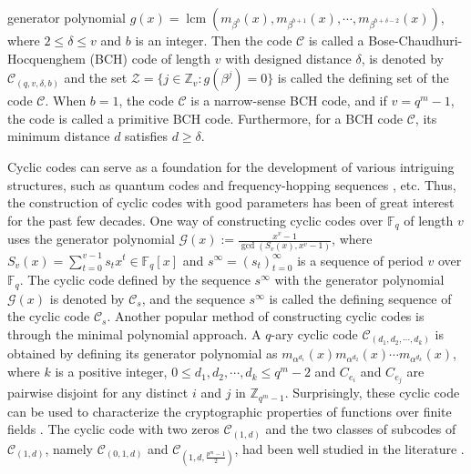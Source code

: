 \documentclass[pdflatex,sn-mathphys-num]{sn-jnl}%
\theoremstyle{thmstyleone}%
\theoremstyle{thmstyletwo}%
\theoremstyle{thmstylethree}%
\begin{document}
generator polynomial $g(x)=\operatorname{lcm}(m_{\beta^{b}}(x), m_{\beta^{b+1}}(x),\cdots,m_{\beta^{b+\delta-2}}(x))$, where $2\leq \delta\leq v$ and $b$ is an integer. Then the code $\mathcal{C}$ is called a Bose-Chaudhuri-Hocquenghem (BCH) code of length $v$ with designed distance $\delta$, is denoted by $\mathcal{C}_{(q,v,\delta,b)}$ and the set $\mathcal{Z}=\{j\in\mathbb{Z}_{v}:g(\beta^{j})=0\}$ is called the defining set of the code $\mathcal{C}$. When $b=1$, the code $\mathcal{C}$ is a narrow-sense BCH code, and if $v=q^m-1$, the code is called a primitive BCH code. Furthermore, for a BCH code $\mathcal{C}$, its minimum distance $d$ satisfies $d\geq\delta$.
\par Cyclic codes can serve as a foundation for the development of various intriguing structures, such as quantum codes \cite{Quantum1} and frequency-hopping sequences \cite{Frequency1}, etc. Thus, the construction of cyclic codes with good parameters has been of great interest for the past few decades. One way of constructing cyclic codes over $\mathbb{F}_{q}$ of length $v$ uses the generator polynomial $\mathcal{G}(x):=\frac{x^v-1}{\operatorname{gcd}(S_{v}(x),x^v-1)}$, where $S_{v}(x)=\sum_{t=0}^{v-1}s_{t}x^t\in\mathbb{F}_{q}[x]$ and $s^{\infty}=(s_{t})_{t=0}^{\infty}$ is a sequence of period $v$ over $\mathbb{F}_{q}$. The cyclic code defined by the sequence $s^{\infty}$ with the generator polynomial $\mathcal{G}(x)$ is denoted by $\mathcal{C}_{s}$, and the sequence $s^{\infty}$ is called the defining sequence of the cyclic code $\mathcal{C}_{s}$. Another popular method of constructing cyclic codes is through the minimal polynomial approach. A $q$-ary cyclic code $\mathcal{C}_{(d_{1},d_{2},\cdots,d_{k})}$ is obtained by defining its generator polynomial as $m_{\alpha^{d_1}}(x)m_{\alpha^{d_2}}(x)\cdots m_{\alpha^{d_k}}(x)$, where $k$ is a positive integer, $0\leq d_1,d_2,\cdots,d_k\leq q^m-2$ and $C_{e_{i}}$ and $ C_{e_j}$ are pairwise disjoint for any distinct $i$ and $j$ in $\mathbb{Z}_{q^m-1}$. Surprisingly, these cyclic code can be used to characterize the cryptographic properties of functions over finite fields \cite{High1,High2,PN1}. The cyclic code with two zeros $\mathcal{C}_{(1,d)}$ and the two classes of subcodes of $\mathcal{C}_{(1,d)}$, namely  $\mathcal{C}_{(0,1,d)}$ and $\mathcal{C}_{(1,d,\frac{p^m-1}{2})}$, had been well studied in the literature \cite{Zero1,Zero2,Zero3,Zero4,Zero5,Zero6,Zero7,Zero8,Zero9}. %
\end{document}
